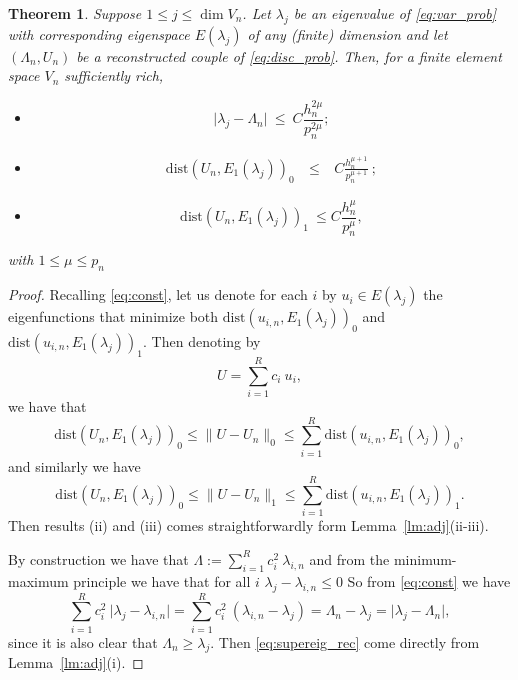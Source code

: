 \documentclass[preprint,12pt]{elsarticle}
\newtheorem{theorem}{Theorem}[section]
\begin{document}
\begin{theorem}
\label{th:adj_rec}
Suppose  $ 1 \leq j\leq \dim V_n$. Let
$\lambda_j$ be an eigenvalue   of \eqref{eq:var_prob} with
corresponding eigenspace $E(\lambda_j)$ of any (finite) dimension  and
let $(\Lambda_n,U_n)$ be a reconstructed couple  of \eqref{eq:disc_prob}.
Then, for a finite element space $V_n$ sufficiently rich,
\begin{itemize}
\item[(i)] 
\begin{equation}
\vert \lambda_j - \Lambda_n \vert \ \leq \ C
\frac{h_n^{2\mu} }{p_n^{2\mu}} ;  \label{eq:supereig_rec}
\end{equation}
\item[(ii)] 
\begin{eqnarray}
\mathrm{dist}(
U_n,E_1(\lambda_j))_{0}\ & \leq& \ C \frac{h_n^{\mu+1} }{p_n^{\mu+1}} \ ; \label{eq:adj_rec}
\end{eqnarray}
\item[(iii)]
\begin{equation}
\label{eq:energy_rec} \mathrm{dist}(
U_n,E_1(\lambda_j))_{1} \ \leq
C \frac{h_n^{\mu}}{p_n^{\mu}},
\end{equation}
\end{itemize}
with $1\leq \mu\leq p_n$
\end{theorem}

\begin{proof}
Recalling \eqref{eq:const}, let us denote for each $i$ by $u_i\in E(\lambda_j)$ the eigenfunctions that minimize both $\mathrm{dist}(
u_{i,n},E_1(\lambda_j))_{0}$ and $\mathrm{dist}(
u_{i,n},E_1(\lambda_j))_{1}$. Then denoting by 
$$
U=\sum_{i=1}^{R} c_i \ u_{i},
$$
we have that
$$
\mathrm{dist}(
U_n,E_1(\lambda_j))_{0}\leq \|U-U_n\|_{0}\leq \sum_{i=1}^{R} \mathrm{dist}(
u_{i,n},E_1(\lambda_j))_{0},
$$
and similarly we have
$$
\mathrm{dist}(
U_n,E_1(\lambda_j))_{0}\leq \|U-U_n\|_{1}\leq \sum_{i=1}^{R} \mathrm{dist}(
u_{i,n},E_1(\lambda_j))_{1}.
$$
Then results (ii) and (iii) comes straightforwardly form Lemma~\ref{lm:adj}(ii-iii).


By construction we have that $\Lambda:=\sum_{i=1}^{R} c_i^2 \ \lambda_{i,n}$ and from the minimum-maximum principle we have that for all $i$ $\lambda_j - \lambda_{i,n}\leq 0$
So from 
\eqref{eq:const} we have
$$
\sum_{i=1}^{R} c_i^2 \ \vert \lambda_j - \lambda_{i,n} \vert=
 \sum_{i=1}^{R} c_i^2 \ (\lambda_{i,n} - \lambda_j )=  \Lambda_n - \lambda_j
 = \vert \lambda_j - \Lambda_n \vert,
$$
since it is also clear that $\Lambda_n\ge \lambda_j$. Then \eqref{eq:supereig_rec} come directly from 
Lemma~\ref{lm:adj}(i).


\end{proof}
\end{document}
